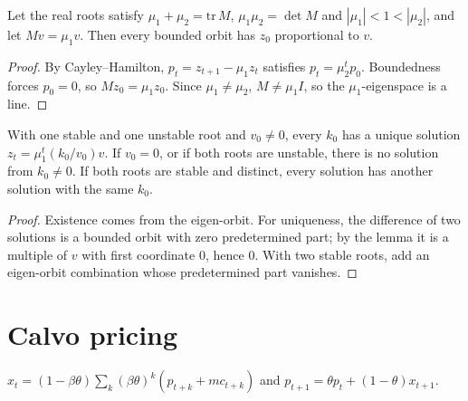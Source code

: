 \begin{lemma}
\label{lem:saddle_span}
\leanok
{}
Let the real roots satisfy $\mu_1 + \mu_2 = \mathrm{tr}\,M$, $\mu_1\mu_2 = \det M$ and $|\mu_1| < 1 < |\mu_2|$, and let
$Mv = \mu_1v$. Then every bounded orbit has $z_0$ proportional to $v$.
\end{lemma}
\begin{proof}
\leanok
By Cayley--Hamilton, $p_t = z_{t+1} - \mu_1z_t$ satisfies $p_t = \mu_2^tp_0$. Boundedness forces $p_0 = 0$, so
$Mz_0 = \mu_1z_0$. Since $\mu_1 \ne \mu_2$, $M \ne \mu_1I$, so the $\mu_1$-eigenspace is a line.
\end{proof}

\begin{theorem}
\label{thm:saddle}
\leanok
{}
With one stable and one unstable root and $v_0 \ne 0$, every $k_0$ has a unique solution $z_t = \mu_1^t(k_0/v_0)v$.
If $v_0 = 0$, or if both roots are unstable, there is no solution from $k_0 \ne 0$. If both roots are stable and
distinct, every solution has another solution with the same $k_0$.
\end{theorem}
\begin{proof}
\leanok
Existence comes from the eigen-orbit. For uniqueness, the difference of two solutions is a bounded orbit with zero
predetermined part; by the lemma it is a multiple of $v$ with first coordinate $0$, hence $0$. With two stable roots,
add an eigen-orbit combination whose predetermined part vanishes.
\end{proof}

\section{Calvo pricing}

\begin{definition}
\label{def:calvo}
\leanok
$x_t = (1-\beta\theta)\sum_k(\beta\theta)^k(p_{t+k} + mc_{t+k})$ and $p_{t+1} = \theta p_t + (1-\theta)x_{t+1}$.
\end{definition}

